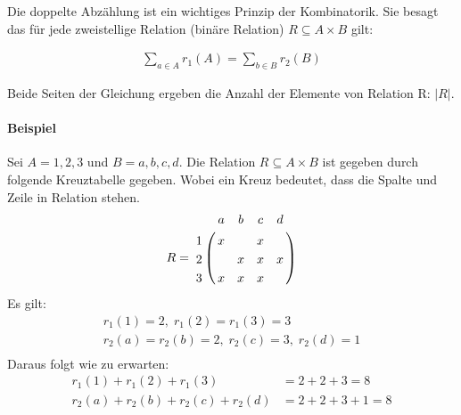 Die doppelte Abzählung ist ein wichtiges Prinzip der Kombinatorik.
Sie besagt das für jede zweistellige Relation (binäre Relation) $R \subseteq A \times B$
gilt:

\begin{align}
  \sum_{a \in A} r_{1}(A) = \sum_{b \in B} r_{2}(B)
\end{align}

Beide Seiten der Gleichung ergeben die Anzahl der Elemente von Relation R: $|R|$.

\paragraph{Beispiel}
Sei $A = {1, 2, 3}$ und $B = {a, b, c, d}$. Die Relation $R \subseteq
A \times B$ ist gegeben durch folgende Kreuztabelle gegeben. Wobei ein
Kreuz bedeutet, dass die Spalte und Zeile in Relation stehen.
\begin{align*}
  R =
  \bordermatrix{
    & a & b & c & d \cr
   1& x &   & x &   \cr
   2&   & x & x & x \cr
   3& x & x & x &   \cr
  }
\end{align*}
Es gilt:
\begin{align*}
  r_{1}(1)=2,\; r_{1}(2)=r_{1}(3)=3\\
  r_{2}(a)=r_{2}(b)=2,\; r_{2}(c)=3,\; r_{2}(d)=1\\
\end{align*}
Daraus folgt wie zu erwarten:
\begin{align*}
  r_{1}(1) + r_{1}(2) + r_{1}(3) &= 2 + 2 + 3 = 8\\
  r_{2}(a) + r_{2}(b) + r_{2}(c) + r_{2}(d) &= 2 + 2 + 3 + 1 = 8
\end{align*}

